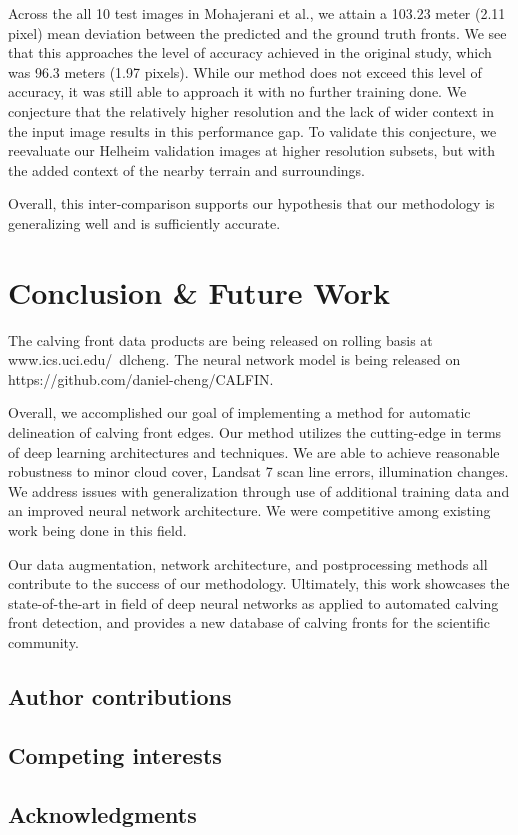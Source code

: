 \documentclass[tc, manuscript]{copernicus}
\begin{document}
Across the all 10 test images in Mohajerani et al., we attain a 103.23 meter (2.11 pixel) mean deviation between the predicted and the ground truth fronts. We see that this approaches the level of accuracy achieved in the original study, which was 96.3 meters (1.97 pixels). While our method does not exceed this level of accuracy, it was still able to approach it with no further training done. We conjecture that the relatively higher resolution and the lack of wider context in the input image results in this performance gap.
To validate this conjecture, we reevaluate our Helheim validation images at higher resolution subsets, but with the added context of the nearby terrain and surroundings. %

Overall, this inter-comparison supports our hypothesis that our methodology is generalizing well and is sufficiently accurate.

\section{Conclusion \& Future Work}
The calving front data products are being released on rolling basis at www.ics.uci.edu/~dlcheng. %
The neural network model is being released on https://github.com/daniel-cheng/CALFIN.

Overall, we accomplished our goal of implementing a method for automatic delineation of calving front edges. Our method utilizes the cutting-edge in terms of deep learning architectures and techniques. We are able to achieve reasonable robustness to minor cloud cover, Landsat 7  scan line errors, illumination changes. We address issues with generalization through use of additional training data and an improved neural network architecture. We were competitive among existing work being done in this field.  

Our data augmentation, network architecture, and postprocessing methods all contribute to the success of our methodology. Ultimately, this work showcases the state-of-the-art in field of deep neural networks as applied to automated calving front detection, and provides a new database of calving fronts for the scientific community.


\subsection{Author contributions}
\subsection{Competing interests}
\subsection{Acknowledgments}

 
\end{document}
